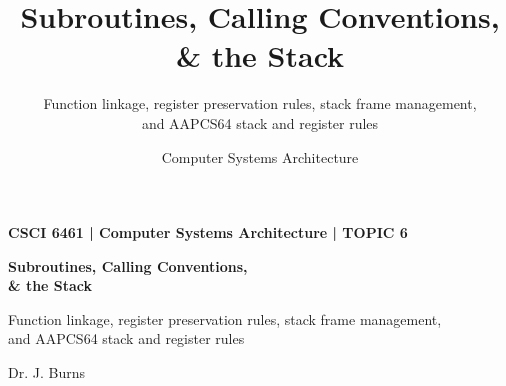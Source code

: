 \documentclass[aspectratio=169,11pt,t]{beamer}
\title[Topic 6]{
  Subroutines, Calling Conventions, \& the Stack
}
\subtitle{
  Function linkage, register preservation rules, stack frame management,\\
  and AAPCS64 stack and register rules
}
\author{
  Computer Systems Architecture
}
\date{}
\begin{document}

\begin{frame}[plain]


\vspace*{\fill}

\begin{minipage}{0.88\textwidth}

{\color{gold}\normalsize\bfseries
CSCI 6461 \;|\; Computer Systems Architecture \;|\; TOPIC 6
\par}

\vspace{0.25cm}

{\color{white}\fontsize{24}{28}\selectfont\bfseries
Subroutines, Calling Conventions,\\[0.08cm]\& the Stack
\par}

\vspace{0.35cm}

{\color{white!80}\large
Function linkage, register preservation rules, stack frame management,\\and AAPCS64 stack and register rules
\par}

\end{minipage}

\vfill

{\color{white!70}\small
Dr. J. Burns
\par}

\vspace*{\fill}

\end{frame}



\end{document}

